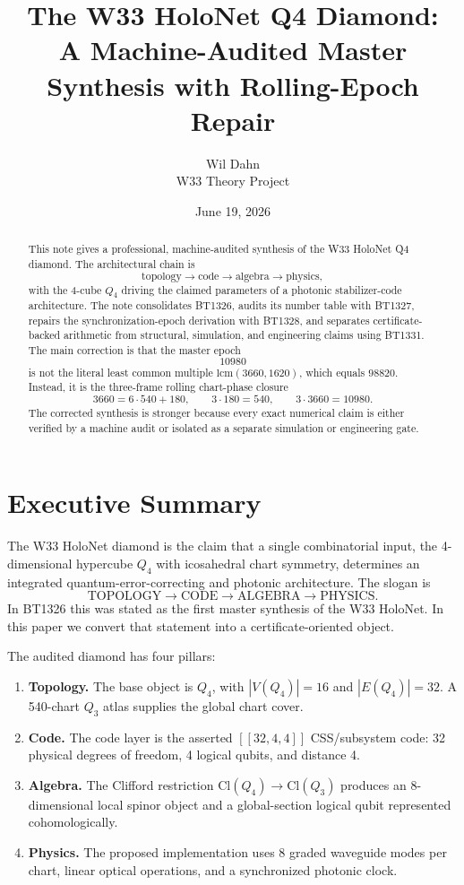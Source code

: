 \documentclass[11pt]{article}
\title{The W33 HoloNet Q4 Diamond:\\A Machine-Audited Master Synthesis with Rolling-Epoch Repair}
\author{Wil Dahn\\W33 Theory Project}
\date{June 19, 2026}
\newcommand{\Qfour}{Q_4}
\newcommand{\Qthree}{Q_3}
\begin{document}
\maketitle

\begin{abstract}
This note gives a professional, machine-audited synthesis of the W33 HoloNet Q4 diamond.  The architectural chain is
\[
  \text{topology} \longrightarrow \text{code} \longrightarrow \text{algebra} \longrightarrow \text{physics},
\]
with the 4-cube \(\Qfour\) driving the claimed parameters of a photonic stabilizer-code architecture.  The note consolidates BT1326, audits its number table with BT1327, repairs the synchronization-epoch derivation with BT1328, and separates certificate-backed arithmetic from structural, simulation, and engineering claims using BT1331.  The main correction is that the master epoch
\[
  10980
\]
is not the literal least common multiple \(\mathrm{lcm}(3660,1620)\), which equals \(98820\).  Instead, it is the three-frame rolling chart-phase closure
\[
  3660=6\cdot 540+180,\qquad 3\cdot180=540,\qquad 3\cdot3660=10980.
\]
The corrected synthesis is stronger because every exact numerical claim is either verified by a machine audit or isolated as a separate simulation or engineering gate.
\end{abstract}

\tableofcontents

\section{Executive Summary}

The W33 HoloNet diamond is the claim that a single combinatorial input, the 4-dimensional hypercube \(\Qfour\) with icosahedral chart symmetry, determines an integrated quantum-error-correcting and photonic architecture.  The slogan is
\[
\boxed{\text{TOPOLOGY}\to\text{CODE}\to\text{ALGEBRA}\to\text{PHYSICS}.}
\]
In BT1326 this was stated as the first master synthesis of the W33 HoloNet.  In this paper we convert that statement into a certificate-oriented object.

The audited diamond has four pillars:
\begin{enumerate}[label=(\roman*)]
  \item \textbf{Topology.}  The base object is \(\Qfour\), with \(|V(\Qfour)|=16\) and \(|E(\Qfour)|=32\).  A 540-chart \(\Qthree\) atlas supplies the global chart cover.
  \item \textbf{Code.}  The code layer is the asserted \([[32,4,4]]\) CSS/subsystem code: 32 physical degrees of freedom, 4 logical qubits, and distance 4.
  \item \textbf{Algebra.}  The Clifford restriction \(\mathrm{Cl}(\Qfour)\to\mathrm{Cl}(\Qthree)\) produces an 8-dimensional local spinor object and a global-section logical qubit represented cohomologically.
  \item \textbf{Physics.}  The proposed implementation uses 8 graded waveguide modes per chart, linear optical operations, and a synchronized photonic clock.
\end{enumerate}
\end{document}

